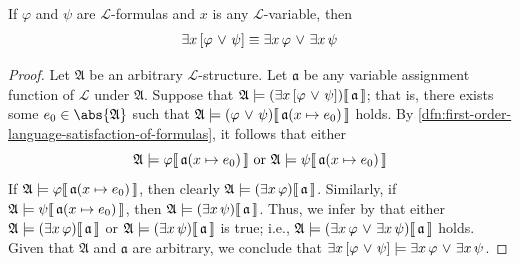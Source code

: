 \begin{thm}
     \label{logical-equivalence:existential-quantifier-distributes-over-disjunction}
    If \( \varphi \) and \( \psi \) are \( \mathcal{L} \)-formulas and \( x \) is any \( \mathcal{L} \)-variable, then
    \begin{equation*}
        \exists x \, \mleft[ \varphi \,\,{\lor}\,\, \psi \mright] \equiv \exists x \, \varphi \,\,{\lor}\,\, \exists x \, \psi
    \end{equation*}
\end{thm}

\begin{proof}
    Let \( \mathfrak{A} \) be an arbitrary \( \mathcal{L} \)-structure. Let \( \mathfrak{a} \) be any variable assignment function of \( \mathcal{L} \) under \( \mathfrak{A} \).
    Suppose that \( \folwffsatisfaction{\mathfrak{A}}{\mleft( \exists x \, \mleft[ \varphi \,\,{\lor}\,\, \psi \mright] \mright)}{\mathfrak{a}} \); that is, there exists
    some \( e_{0} \in \abs{\mathfrak{A}} \) such that
    \( \folwffsatisfaction{\mathfrak{A}}{ \mleft( \varphi \,\,{\lor}\,\, \psi \mright) }{ \folmodifiedvariableassignmentfunction{\mathfrak{a}}{x}{e_{0}} } \) holds.
    By \cref{dfn:first-order-language-satisfaction-of-formulas}, it follows that either
    \begin{equation}
        \label{eq:either-phi-or-psi-is-satisfied-with-e0}
        \folwffsatisfaction{\mathfrak{A}}{\varphi}{ \folmodifiedvariableassignmentfunction{\mathfrak{a}}{x}{e_{0}} } \ \text{or}
        \ \folwffsatisfaction{\mathfrak{A}}{\psi}{ \folmodifiedvariableassignmentfunction{\mathfrak{a}}{x}{e_{0}} }
    \end{equation}
    If \( \folwffsatisfaction{\mathfrak{A}}{\varphi}{ \folmodifiedvariableassignmentfunction{\mathfrak{a}}{x}{e_{0}} } \), then
    clearly \( \folwffsatisfaction{\mathfrak{A}}{ \mleft( \exists x \, \varphi \mright) }{\mathfrak{a}} \).
    Similarly, if \( \folwffsatisfaction{\mathfrak{A}}{\psi}{ \folmodifiedvariableassignmentfunction{\mathfrak{a}}{x}{e_{0}} } \),
    then \( \folwffsatisfaction{\mathfrak{A}}{ \mleft( \exists x \, \psi \mright) }{\mathfrak{a}} \).
    Thus, we infer by  that either
    \( \folwffsatisfaction{\mathfrak{A}}{\mleft( \exists x \, \varphi \mright)}{\mathfrak{a}} \) or
    \( \folwffsatisfaction{\mathfrak{A}}{ \mleft( \exists x \, \psi \mright) }{\mathfrak{a}} \) is true;
    i.e., \( \folwffsatisfaction{\mathfrak{A}}{\mleft( \exists x \, \varphi \,\,{\lor}\,\, \exists x \, \psi \mright)}{\mathfrak{a}} \) holds.
    Given that \( \mathfrak{A} \) and \( \mathfrak{a} \) are arbitrary,
    we conclude that \( \exists x \, \mleft[ \varphi \,\,{\lor}\,\, \psi \mright] \models \exists x \, \varphi \,\,{\lor}\,\, \exists x \, \psi \).


\end{proof}
